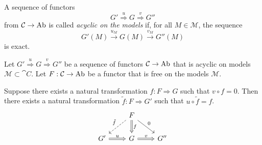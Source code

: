 \documentclass[12pt]{article}
\begin{document}
\begin{definition}
	A sequence of functors 
	\begin{equation*}
		G' \overset{u}{\Rightarrow} G \overset{v}{\Rightarrow} G''
	\end{equation*}
	from $\mathcal{C}\to\text{Ab}$ is called \emph{acyclic on the models} if, for all $M\in\mathcal{M}$, the sequence 
	\begin{equation*}
		G'(M) \overset{u_M}{\to} G(M) \overset{v_M}{\to} G''(M)
	\end{equation*}
	is exact.
\end{definition}

\begin{lemma}
	Let $G'\overset{u}{\Rightarrow} G\overset{v}{\Rightarrow} G''$ be a sequence of functors $\mathcal{C}\to\text{Ab}$ that is acyclic on models $\mathcal{M}\subset\cat{C}$. Let $F:\mathcal{C}\to\text{Ab}$ be a functor that is free on the models $\mathcal{M}$. 

	Suppose there exists a natural transformation $f:F\Rightarrow G$ such that $v\circ f=0$. Then there exists a natural transformation $\tilde{f}:F\Rightarrow G'$ such that $u\circ\tilde{f}=f$.
	\begin{equation*}
\begin{tikzcd}
                              & F \arrow[d, "f", Rightarrow] \arrow[rd, "0"] \arrow[ld, "\tilde{f}"', dashed] &     \\
G' \arrow[r, "u", Rightarrow] & G \arrow[r, "v", Rightarrow]                                                  & G''
\end{tikzcd}
	\end{equation*}
\end{lemma}
\end{document}
